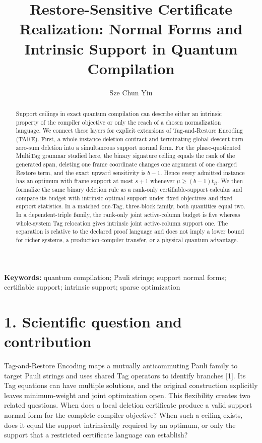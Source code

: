 \documentclass[11pt]{article}
\title{Restore-Sensitive Certificate Realization: Normal Forms and Intrinsic Support in Quantum Compilation}
\author{Sze Chun Yiu}
\date{}
\begin{document}
\maketitle
\begin{abstract}
Support ceilings in exact quantum compilation can describe either an intrinsic property of the compiler objective or only the reach of a chosen normalization language. We connect these layers for explicit extensions of Tag-and-Restore Encoding (TARE). First, a whole-instance deletion contract and terminating global descent turn zero-sum deletion into a simultaneous support normal form. For the phase-quotiented MultiTag grammar studied here, the binary signature ceiling equals the rank of the generated span, deleting one frame coordinate changes one argument of one charged Restore term, and the exact upward sensitivity is \(b-1\). Hence every admitted instance has an optimum with frame support at most \(s+1\) whenever \(\mu\geq(b-1)t_R\). We then formalize the same binary deletion rule as a rank-only certifiable-support calculus and compare its budget with intrinsic optimal support under fixed objectives and fixed support statistics. In a matched one-Tag, three-block family, both quantities equal two. In a dependent-triple family, the rank-only joint active-column budget is five whereas whole-system Tag relocation gives intrinsic joint active-column support one. The separation is relative to the declared proof language and does not imply a lower bound for richer systems, a production-compiler transfer, or a physical quantum advantage.
\end{abstract}
\noindent\textbf{Keywords:} quantum compilation; Pauli strings; support normal forms; certifiable support; intrinsic support; sparse optimization

\section*{1. Scientific question and contribution}\label{scientific-question-and-contribution}

Tag-and-Restore Encoding maps a mutually anticommuting Pauli family to target Pauli strings and uses shared Tag operators to identify branches {[}1{]}. Its Tag equations can have multiple solutions, and the original construction explicitly leaves minimum-weight and joint optimization open. This flexibility creates two related questions. When does a local deletion certificate produce a valid support normal form for the complete compiler objective? When such a ceiling exists, does it equal the support intrinsically required by an optimum, or only the support that a restricted certificate language can establish?
\end{document}
